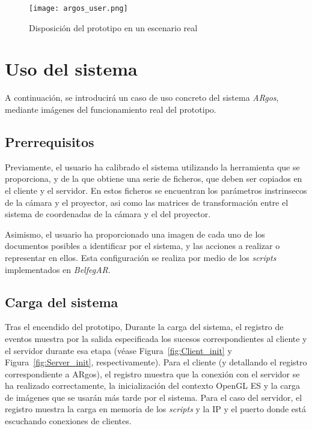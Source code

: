 \begin{figure}
  \begin{center}
    \texttt{[image: argos\_user.png]}
    \caption{Disposición del prototipo en un escenario real}
    \label{fig:ARgos_user}
  \end{center}
\end{figure}


\section{Uso del sistema}

A continuación, se introducirá un caso de uso concreto del sistema \textit{ARgos}, mediante imágenes del funcionamiento real del prototipo. 

\subsection{Prerrequisitos}
Previamente, el usuario ha calibrado el sistema utilizando la herramienta que se proporciona, y de la que obtiene una serie de ficheros, que deben ser copiados en el cliente y el servidor. En estos ficheros se encuentran los parámetros instrinsecos de la cámara y el proyector, asi como las matrices de transformación entre el sistema de coordenadas de la cámara y el del proyector.

Asimismo, el usuario ha proporcionado una imagen de cada uno de los documentos posibles a identificar por el sistema, y las acciones a realizar o representar en ellos. Esta configuración se realiza por medio de los \textit{scripts} implementados en \textit{BelfegAR}.
 
\subsection{Carga del sistema}
Tras el encendido del prototipo,  Durante la carga del sistema, el registro de eventos muestra por la salida especificada los sucesos correspondientes al cliente y el servidor durante esa etapa (véase Figura~\ref{fig:Client_init} y
Figura~\ref{fig:Server_init}, respectivamente). Para el cliente (y detallando el registro correspondiente a ARgos), el registro muestra que la conexión con el servidor se ha realizado
correctamente, la inicialización del contexto OpenGL ES y la carga de imágenes que se usarán más tarde por el sistema. Para el caso del servidor, el registro muestra la carga en memoria de los
\textit{scripts} y la IP y el puerto donde está escuchando conexiones de clientes.

